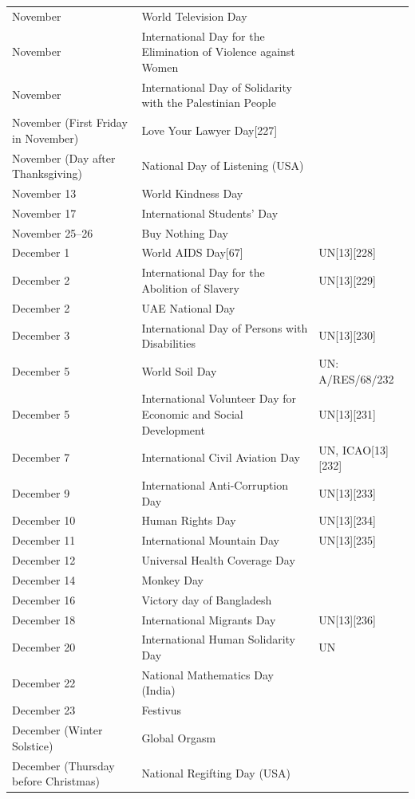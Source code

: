 \documentclass[
]{book}
\begin{document}
\begin{longtable}[t]{>{\raggedright\arraybackslash}p{8em}>{\raggedright\arraybackslash}p{20em}>{\raggedright\arraybackslash}p{12em}}
\addlinespace
21 November & World Television Day & \\
25 November & International Day for the Elimination of Violence against Women & \\
29 November & International Day of Solidarity with the Palestinian People & \\
November (First Friday in November) & Love Your Lawyer Day[227] & \\
November (Day after Thanksgiving) & National Day of Listening (USA) & \\
\addlinespace
November 13 & World Kindness Day & \\
November 17 & International Students' Day & \\
November 25–26 & Buy Nothing Day & \\
December 1 & World AIDS Day[67] & UN[13][228]\\
December 2 & International Day for the Abolition of Slavery & UN[13][229]\\
\addlinespace
December 2 & UAE National Day & \\
December 3 & International Day of Persons with Disabilities & UN[13][230]\\
December 5 & World Soil Day & UN: A/RES/68/232\\
December 5 & International Volunteer Day for Economic and Social Development & UN[13][231]\\
December 7 & International Civil Aviation Day & UN, ICAO[13][232]\\
\addlinespace
December 9 & International Anti-Corruption Day & UN[13][233]\\
December 10 & Human Rights Day & UN[13][234]\\
December 11 & International Mountain Day & UN[13][235]\\
December 12 & Universal Health Coverage Day & \\
December 14 & Monkey Day & \\
\addlinespace
December 16 & Victory day of Bangladesh & \\
December 18 & International Migrants Day & UN[13][236]\\
December 20 & International Human Solidarity Day & UN\\
December 22 & National Mathematics Day (India) & \\
December 23 & Festivus & \\
\addlinespace
December (Winter Solstice) & Global Orgasm & \\
December (Thursday before Christmas) & National Regifting Day (USA) & \\
\bottomrule
\end{longtable}
\end{document}
